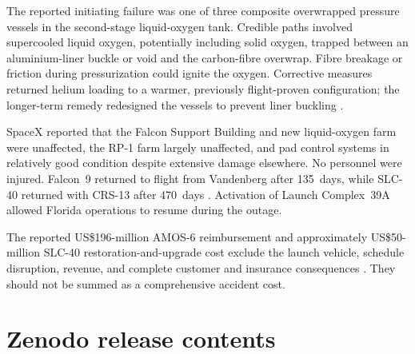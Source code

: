 \documentclass[]{seismica}
\begin{document}
The reported initiating failure was one of three composite overwrapped pressure
vessels in the second-stage liquid-oxygen tank. Credible paths involved
supercooled liquid oxygen, potentially including solid oxygen, trapped between
an aluminium-liner buckle or void and the carbon-fibre overwrap. Fibre breakage
or friction during pressurization could ignite the oxygen. Corrective measures
returned helium loading to a warmer, previously flight-proven configuration;
the longer-term remedy redesigned the vessels to prevent liner buckling
\citep{spacex_anomaly_2017}.

SpaceX reported that the Falcon Support Building and new liquid-oxygen farm
were unaffected, the RP-1 farm largely unaffected, and pad control systems in
relatively good condition despite extensive damage elsewhere. No personnel
were injured. Falcon~9 returned to flight from Vandenberg after 135~days, while
SLC-40 returned with CRS-13 after 470~days
\citep{spacex_iridium1_2017,spacex_crs13_2017}. Activation of Launch
Complex~39A allowed Florida operations to resume during the outage.

The reported US\$196-million AMOS-6 reimbursement and approximately
US\$50-million SLC-40 restoration-and-upgrade cost exclude the launch vehicle,
schedule disruption, revenue, and complete customer and insurance consequences
\citep{magan_amos6_2016,clark_slc40_2017}. They should not be summed as a
comprehensive accident cost.

\section*{Zenodo release contents}
\end{document}
